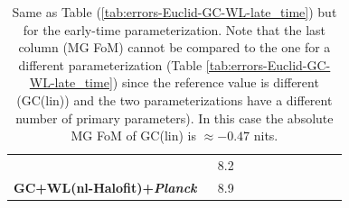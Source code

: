 \begin{table}[htbp]
\begin{tabular}{|l|c|c|c|c|c||c|c|c|c|}
& 8.2  \tabularnewline
\Tstrut \textbf{GC+WL(nl-Halofit)+{\it Planck} $\;$}   
& 8.9  \tabularnewline
\hline
\end{tabular}
\small
\protect\caption[1$\sigma$ marginalized errors for a Euclid GC and WL forecast in the late-time parameterization.]{\label{tab:errors-Euclid-GC-WL-early_time}
Same as Table (\ref{tab:errors-Euclid-GC-WL-late_time}) but for the  early-time parameterization. Note that the last column (MG FoM) cannot be compared to the one for a different parameterization (Table \ref{tab:errors-Euclid-GC-WL-late_time}) since the reference value is different (GC(lin)) and the two parameterizations have a different number of primary parameters). In this case the absolute MG FoM of GC(lin) is $\approx -0.47$ nits.
}
\end{table}
\normalsize

